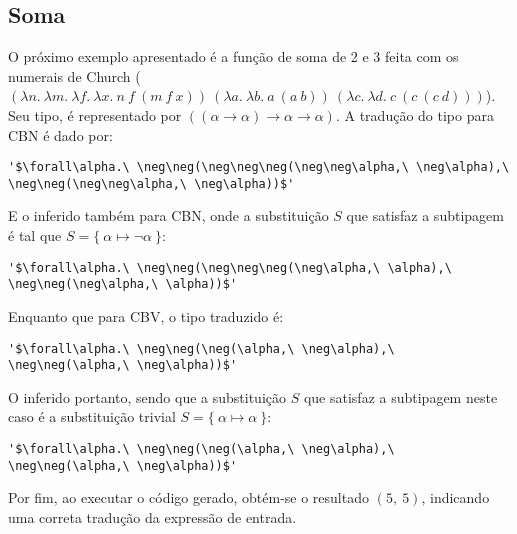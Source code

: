 \subsection{Soma}
O próximo exemplo apresentado é a função de soma de 2 e 3 feita com os numerais de Church ($(\lambda n.\ \lambda m.\ \lambda f.\ \lambda x.\ n\ f\ (m\ f\ x))\ (\lambda a.\ \lambda b.\ a\ (a\ b))\ (\lambda c.\ \lambda d.\ c\ (c\ (c\ d)))$).
Seu tipo, é representado por $((\alpha \to \alpha) \to \alpha \to \alpha)$.
A tradução do tipo para CBN é dado por:
\lstset{extendedchars=false, escapeinside=''}
\begin{lstlisting}[style=output,caption={Tradução em CBN do tipo da função de soma}]
  '$\forall\alpha.\ \neg\neg(\neg\neg\neg(\neg\neg\alpha,\ \neg\alpha),\ \neg\neg(\neg\neg\alpha,\ \neg\alpha))$'
\end{lstlisting}
E o inferido também para CBN, onde a substituição $S$ que satisfaz a subtipagem é tal que $S = \{\ \alpha \mapsto \neg\alpha\ \}$:
\lstset{extendedchars=false, escapeinside=''}
\begin{lstlisting}[style=output,caption={Inferência do tipo da função de soma traduzido em CBN}]
  '$\forall\alpha.\ \neg\neg(\neg\neg\neg(\neg\alpha,\ \alpha),\ \neg\neg(\neg\alpha,\ \alpha))$'
\end{lstlisting}
Enquanto que para CBV, o tipo traduzido é:
\lstset{extendedchars=false, escapeinside=''}
\begin{lstlisting}[style=output,caption={Tradução em CBV do tipo da função de soma}]
  '$\forall\alpha.\ \neg\neg(\neg(\alpha,\ \neg\alpha),\ \neg\neg(\alpha,\ \neg\alpha))$'
\end{lstlisting}
O inferido portanto, sendo que a substituição $S$ que satisfaz a subtipagem neste caso é a substituição trivial $S = \{\ \alpha \mapsto \alpha\ \}$:
\lstset{extendedchars=false, escapeinside=''}
\begin{lstlisting}[style=output,caption={Inferência do tipo da função de soma traduzido em CBV}]
  '$\forall\alpha.\ \neg\neg(\neg(\alpha,\ \neg\alpha),\ \neg\neg(\alpha,\ \neg\alpha))$'
\end{lstlisting}
Por fim, ao executar o código gerado, obtém-se o resultado $(5,\ 5)$, indicando uma correta tradução da expressão de entrada.

